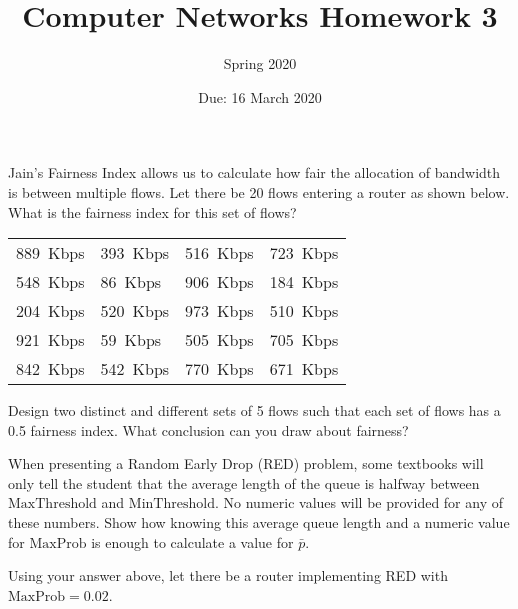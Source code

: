 \documentclass[12pt,addpoints,answers]{exam}
\title{Computer Networks Homework 3}
\author{Spring 2020}
\date{Due: 16 March 2020}
\begin{document}
\maketitle

\begin{questions}
\question[10] Jain's Fairness Index allows us to calculate how fair the allocation of bandwidth is between multiple flows. Let there be 20 flows entering a router as shown below. What is the fairness index for this set of flows?
\begin{center}
\begin{tabularx}{0.7\linewidth}{>{\raggedleft\arraybackslash}X>{\raggedleft\arraybackslash}X>{\raggedleft\arraybackslash}X>{\raggedleft\arraybackslash}X}
\SI{889}{Kbps} & \SI{393}{Kbps} & \SI{516}{Kbps} & \SI{723}{Kbps} \\
\SI{548}{Kbps} &  \SI{86}{Kbps} & \SI{906}{Kbps} & \SI{184}{Kbps} \\
\SI{204}{Kbps} & \SI{520}{Kbps} & \SI{973}{Kbps} & \SI{510}{Kbps} \\
\SI{921}{Kbps} &  \SI{59}{Kbps} & \SI{505}{Kbps} & \SI{705}{Kbps} \\
\SI{842}{Kbps} & \SI{542}{Kbps} & \SI{770}{Kbps} & \SI{671}{Kbps} \\
\end{tabularx}
\end{center}
\begin{solution}
\end{solution}

\question[10] Design two distinct and different sets of 5 flows such that each set of flows has a 0.5 fairness index. What conclusion can you draw about fairness?
\begin{solution}
\end{solution}

\question[5] When presenting a Random Early Drop (RED) problem, some textbooks will only tell the student that the average length of the queue is halfway between $\mathrm{MaxThreshold}$ and $\mathrm{MinThreshold}$. No numeric values will be provided for any of these numbers. Show how knowing this average queue length and a numeric value for $\mathrm{MaxProb}$ is enough to calculate a value for $\bar{p}$.
\begin{solution}
\end{solution}

\question Using your answer above, let there be a router implementing RED with $\mathrm{MaxProb} = 0.02$.
\end{questions}
\end{document}

